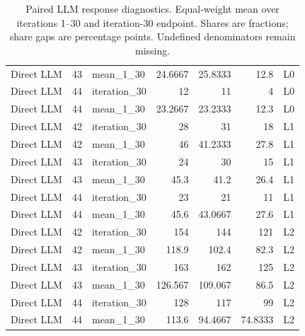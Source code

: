 \begin{table}[htbp!]
\begin{tabular}{lrlrrrl}
Direct LLM & 43 & mean\_1\_30 & 24.6667 & 25.8333 & 12.8 & L0 \\
Direct LLM & 44 & iteration\_30 & 12 & 11 & 4 & L0 \\
Direct LLM & 44 & mean\_1\_30 & 23.2667 & 23.2333 & 12.3 & L0 \\
Direct LLM & 42 & iteration\_30 & 28 & 31 & 18 & L1 \\
Direct LLM & 42 & mean\_1\_30 & 46 & 41.2333 & 27.8 & L1 \\
Direct LLM & 43 & iteration\_30 & 24 & 30 & 15 & L1 \\
Direct LLM & 43 & mean\_1\_30 & 45.3 & 41.2 & 26.4 & L1 \\
Direct LLM & 44 & iteration\_30 & 23 & 21 & 11 & L1 \\
Direct LLM & 44 & mean\_1\_30 & 45.6 & 43.0667 & 27.6 & L1 \\
Direct LLM & 42 & iteration\_30 & 154 & 144 & 121 & L2 \\
Direct LLM & 42 & mean\_1\_30 & 118.9 & 102.4 & 82.3 & L2 \\
Direct LLM & 43 & iteration\_30 & 163 & 162 & 125 & L2 \\
Direct LLM & 43 & mean\_1\_30 & 126.567 & 109.067 & 86.5 & L2 \\
Direct LLM & 44 & iteration\_30 & 128 & 117 & 99 & L2 \\
Direct LLM & 44 & mean\_1\_30 & 113.6 & 94.4667 & 74.8333 & L2 \\
\hline
\end{tabular}
\caption{Paired LLM response diagnostics. Equal-weight mean over iterations 1--30 and iteration-30 endpoint. Shares are fractions; share gaps are percentage points. Undefined denominators remain missing.}
\label{chap:results:tab:rq2_llm_eligibility}
\end{table}
